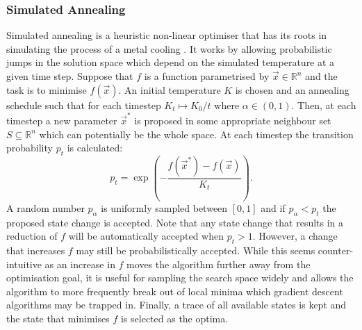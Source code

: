 \subsubsection{Simulated Annealing}
Simulated annealing is a heuristic non-linear optimiser that has its roots in simulating the process of a metal cooling \cite{William_H_Press2007-kb}. It works by allowing probabilistic jumps in the solution space which depend on the simulated temperature at a given time step. Suppose that $f$ is a function parametrised by $\vec{x} \in \mathbb{R}^n$ and the task is to minimise $f(\vec{x})$. An initial temperature $K$ is chosen and an annealing schedule such that for each timestep $K_t \mapsto K_0 / t$ where $\alpha \in (0, 1)$. Then, at each timestep a new parameter $\vec{x}^*$ is proposed in some appropriate neighbour set $S \subseteq \mathbb{R}^n$ which can potentially be the whole space. At each timestep the transition probability $p_t$ is calculated:
\begin{equation}
p_t = \exp\left(-\frac{f(\vec{x}^*)- f(\vec{x})}{K_t}\right).
\end{equation}
A random number $p_\alpha$ is uniformly sampled between $[0, 1]$ and if $p_\alpha < p_t$ the proposed state change is accepted. Note that any state change that results in a reduction of $f$ will be automatically accepted when $p_t > 1$. However, a change that increases $f$ may still be probabilistically accepted. While this seems counter-intuitive as an increase in $f$ moves the algorithm further away from the optimisation goal, it is useful for sampling the search space widely and allows the algorithm to more frequently break out of local minima which gradient descent algorithms may be trapped in. Finally, a trace of all available states is kept and the state that minimises $f$ is selected as the optima. 

